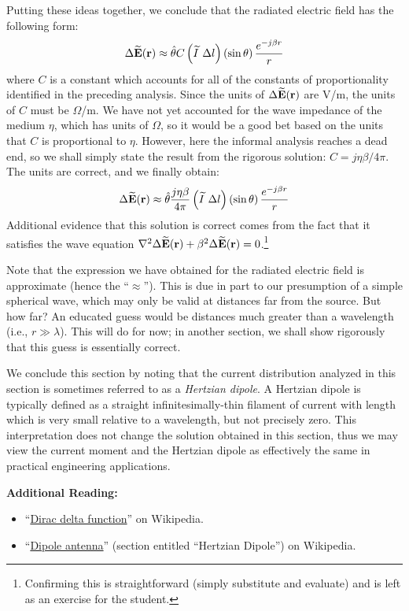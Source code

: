 %
Putting these ideas together, we conclude that the radiated electric field has the following form:
%
\begin{equation}
\Delta\widetilde{\bf E}({\bf r}) \approx \hat{\bf \theta} C \left(\widetilde{I}~\Delta l\right) \left(\sin\theta\right) \frac{e^{-j\beta r}}{r}
\end{equation}
%
where $C$ is a constant which accounts for all of the constants of proportionality identified in the preceding analysis.
Since the units of $\Delta\widetilde{\bf E}({\bf r})$ are V/m, the units of $C$ must be $\Omega$/m.
We have not yet accounted for the wave impedance of the medium $\eta$, which has units of $\Omega$, so it would be a good bet based on the units that $C$ is proportional to $\eta$.
However, here the informal analysis reaches a dead end, so we shall simply state the result from the rigorous solution: $C=j\eta\beta/4\pi$.  The units are correct, and we finally obtain:
%
\begin{equation}
\Delta\widetilde{\bf E}({\bf r}) \approx \hat{\bf \theta} \frac{j\eta\beta}{4\pi} \left(\widetilde{I}~\Delta l\right) \left(\sin\theta\right)  \frac{e^{-j\beta r}}{r}
\end{equation}
%
Additional evidence that this solution is correct comes from the fact that it satisfies the wave equation 
$\nabla^2 \Delta\widetilde{\bf E}({\bf r}) + \beta^2 \Delta\widetilde{\bf E}({\bf r}) = 0$.\footnote{Confirming this is straightforward (simply substitute and evaluate) and is left as an exercise for the student.}

Note that the expression we have obtained for the radiated electric field is approximate (hence the ``$\approx$'').
This is due in part to our presumption of a simple spherical wave, which may only be valid at distances far from the source.
But how far?
An educated guess would be distances much greater than a wavelength (i.e., $r\gg\lambda$).
This will do for now; in another section, we shall show rigorously that this guess is essentially correct.

We conclude this section by noting that the current distribution analyzed in this section is sometimes referred to as a \emph{Hertzian dipole}.
A Hertzian dipole is typically defined as a straight infinitesimally-thin filament of current with length which is very small relative to a wavelength, but not precisely zero.  
This interpretation does not change the solution obtained in this section,
thus we may view the current moment and the Hertzian dipole as effectively the same in practical engineering applications. 


{\bf Additional Reading:}
\begin{itemize}
\item ``\href{https://en.wikipedia.org/wiki/Dirac_delta_function}{Dirac delta function}'' on Wikipedia.
\item ``\href{https://en.wikipedia.org/wiki/Dipole_antenna#Hertzian_dipole}{Dipole antenna}'' (section entitled ``Hertzian Dipole'') on Wikipedia.
\end{itemize}



